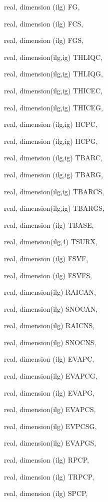 {\begin{DoxyParamCaption}
\item[{real, dimension    (ilg)}]{F\+G, }
\item[{real, dimension   (ilg)}]{F\+C\+S, }
\item[{real, dimension   (ilg)}]{F\+G\+S, }
\item[{real, dimension(ilg,ig)}]{T\+H\+L\+I\+Q\+C, }
\item[{real, dimension(ilg,ig)}]{T\+H\+L\+I\+Q\+G, }
\item[{real, dimension(ilg,ig)}]{T\+H\+I\+C\+E\+C, }
\item[{real, dimension(ilg,ig)}]{T\+H\+I\+C\+E\+G, }
\item[{real, dimension  (ilg,ig)}]{H\+C\+P\+C, }
\item[{real, dimension  (ilg,ig)}]{H\+C\+P\+G, }
\item[{real, dimension (ilg,ig)}]{T\+B\+A\+R\+C, }
\item[{real, dimension (ilg,ig)}]{T\+B\+A\+R\+G, }
\item[{real, dimension(ilg,ig)}]{T\+B\+A\+R\+C\+S, }
\item[{real, dimension(ilg,ig)}]{T\+B\+A\+R\+G\+S, }
\item[{real, dimension (ilg)}]{T\+B\+A\+S\+E, }
\item[{real, dimension(ilg,4)}]{T\+S\+U\+R\+X, }
\item[{real, dimension  (ilg)}]{F\+S\+V\+F, }
\item[{real, dimension (ilg)}]{F\+S\+V\+F\+S, }
\item[{real, dimension(ilg)}]{R\+A\+I\+C\+A\+N, }
\item[{real, dimension(ilg)}]{S\+N\+O\+C\+A\+N, }
\item[{real, dimension(ilg)}]{R\+A\+I\+C\+N\+S, }
\item[{real, dimension(ilg)}]{S\+N\+O\+C\+N\+S, }
\item[{real, dimension (ilg)}]{E\+V\+A\+P\+C, }
\item[{real, dimension(ilg)}]{E\+V\+A\+P\+C\+G, }
\item[{real, dimension (ilg)}]{E\+V\+A\+P\+G, }
\item[{real, dimension(ilg)}]{E\+V\+A\+P\+C\+S, }
\item[{real, dimension(ilg)}]{E\+V\+P\+C\+S\+G, }
\item[{real, dimension(ilg)}]{E\+V\+A\+P\+G\+S, }
\item[{real, dimension  (ilg)}]{R\+P\+C\+P, }
\item[{real, dimension (ilg)}]{T\+R\+P\+C\+P, }
\item[{real, dimension  (ilg)}]{S\+P\+C\+P, }

\end{DoxyParamCaption}}
